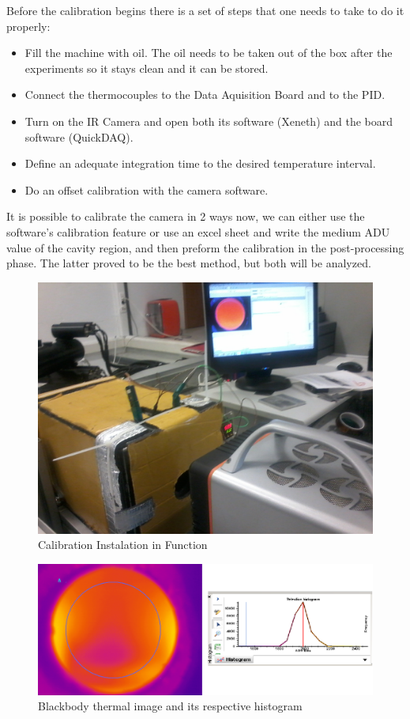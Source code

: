 \par Before the calibration begins there is a set of steps that one needs to take to do it properly:
\begin{itemize}
\item Fill the machine with oil. The oil needs to be taken out of the box after the experiments so it stays clean and it can be stored.
\item Connect the thermocouples to the Data Aquisition Board and to the PID.
\item Turn on the IR Camera and open both its software (Xeneth) and the board software (QuickDAQ).
\item Define an adequate integration time to the desired temperature interval.
\item Do an offset calibration with the camera software.
\end{itemize}

\par It is possible to calibrate the camera in 2 ways now, we can either use the software's calibration feature or use an excel sheet and write the medium ADU value of the cavity region, and then preform the calibration in the post-processing phase. The latter proved to be the best method, but both will be analyzed. \\

\begin{figure}[h]
\centering
\includegraphics[width=0.55\linewidth]{Figures/4.Chapter/calibinprog.jpg}
\caption{Calibration Instalation in Function}
\label{fig:calibinprog}
\end{figure}

\begin{figure}[h]
\centering
\includegraphics[width=1\linewidth]{Figures/4.Chapter/ex11.png}
\caption{Blackbody thermal image and its respective histogram}
\label{fig:ex1}
\end{figure}

